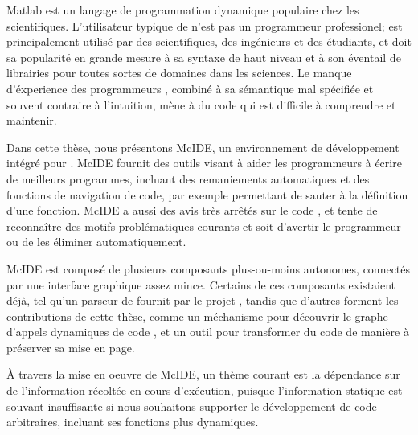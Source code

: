 {\sc Matlab}\textsuperscript{\textregistered} est un langage de programmation
dynamique populaire chez les scientifiques. L'utilisateur typique de \matlab
n'est pas un programmeur professionel; \matlab est
principalement utilis\'{e} par des scientifiques, des ing\'{e}nieurs et des
\'{e}tudiants, et doit sa popularit\'{e} en grande mesure \`{a} sa syntaxe de
haut niveau et \`{a} son \'{e}ventail de librairies pour toutes sortes de
domaines dans les sciences. Le manque d'\'{e}xperience des programmeurs
\matlab, combin\'{e} \`{a} sa s\'{e}mantique mal sp\'{e}cifi\'{e}e et
souvent contraire \`{a} l'intuition, m\`{e}ne \`{a} du code \matlab qui est
difficile \`{a} comprendre et maintenir.

Dans cette th\`{e}se, nous pr\'{e}sentons McIDE, un environnement de
d\'{e}veloppement int\'{e}gr\'{e} pour \matlab. McIDE fournit des outils visant
\`{a} aider les programmeurs \matlab \`{a} \'{e}crire de meilleurs programmes,
incluant des remaniements automatiques et des fonctions de navigation de code,
par exemple permettant de sauter \`{a} la d\'{e}finition d'une fonction. McIDE
a aussi des avis tr\`{e}s arr\^{e}t\'{e}s sur le code \matlab, et tente de
reconna\^{i}tre des motifs probl\'{e}matiques courants et soit d'avertir le
programmeur ou de les \'{e}liminer automatiquement.

McIDE est compos\'{e} de plusieurs composants plus-ou-moins autonomes,
connect\'{e}s par une interface graphique assez mince. Certains de ces
composants existaient d\'{e}j\`{a}, tel qu'un parseur de \matlab fournit par le
projet \mclab, tandis que d'autres forment les contributions de cette
th\`{e}se, comme un m\'{e}chanisme pour d\'{e}couvrir le graphe d'appels
dynamiques de code \matlab, et un outil pour transformer du code de mani\`{e}re
\`{a} pr\'{e}server sa mise en page.

\`{A} travers la mise en oeuvre de McIDE, un th\`{e}me courant est la
d\'{e}pendance sur de l'information r\'{e}colt\'{e}e en cours
d'ex\'{e}cution, puisque l'information statique est souvant insuffisante si
nous souhaitons supporter le d\'{e}veloppement de code \matlab arbitraires,
incluant ses fonctions plus dynamiques.
